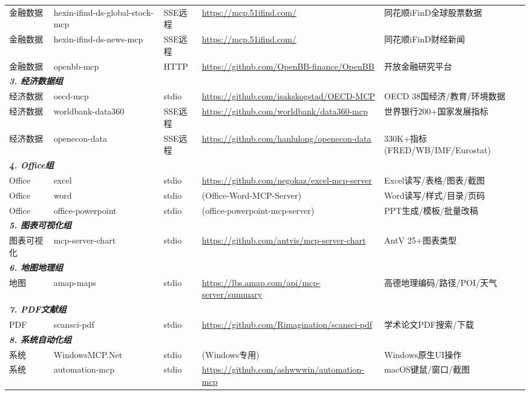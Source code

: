 \begin{table}[H]
\begin{tabular}{llllp{4cm}}
金融数据 & hexin-ifind-ds-global-stock-mcp & SSE远程 & \url{https://mcp.51ifind.com/} & 同花顺iFinD全球股票数据 \\
金融数据 & hexin-ifind-ds-news-mcp & SSE远程 & \url{https://mcp.51ifind.com/} & 同花顺iFinD财经新闻 \\
金融数据 & openbb-mcp & HTTP & \url{https://github.com/OpenBB-finance/OpenBB} & 开放金融研究平台 \\
\midrule
\multicolumn{5}{l}{\textit{\textbf{3. 经济数据组}}} \\
\midrule
经济数据 & oecd-mcp & stdio & \url{https://github.com/isakskogstad/OECD-MCP} & OECD 38国经济/教育/环境数据 \\
经济数据 & worldbank-data360 & SSE远程 & \url{https://github.com/worldbank/data360-mcp} & 世界银行200+国家发展指标 \\
经济数据 & openecon-data & SSE远程 & \url{https://github.com/hanlulong/openecon-data} & 330K+指标(FRED/WB/IMF/Eurostat) \\
\midrule
\multicolumn{5}{l}{\textit{\textbf{4. Office组}}} \\
\midrule
Office & excel & stdio & \url{https://github.com/negokaz/excel-mcp-server} & Excel读写/表格/图表/截图 \\
Office & word & stdio & (Office-Word-MCP-Server) & Word读写/样式/目录/页码 \\
Office & office-powerpoint & stdio & (office-powerpoint-mcp-server) & PPT生成/模板/批量改稿 \\
\midrule
\multicolumn{5}{l}{\textit{\textbf{5. 图表可视化组}}} \\
\midrule
图表可视化 & mcp-server-chart & stdio & \url{https://github.com/antvis/mcp-server-chart} & AntV 25+图表类型 \\
\midrule
\multicolumn{5}{l}{\textit{\textbf{6. 地图地理组}}} \\
\midrule
地图 & amap-maps & stdio & \url{https://lbs.amap.com/api/mcp-server/summary} & 高德地理编码/路径/POI/天气 \\
\midrule
\multicolumn{5}{l}{\textit{\textbf{7. PDF文献组}}} \\
\midrule
PDF & scansci-pdf & stdio & \url{https://github.com/Rimagination/scansci-pdf} & 学术论文PDF搜索/下载 \\
\midrule
\multicolumn{5}{l}{\textit{\textbf{8. 系统自动化组}}} \\
\midrule
系统 & WindowsMCP.Net & stdio & (Windows专用) & Windows原生UI操作 \\
系统 & automation-mcp & stdio & \url{https://github.com/ashwwwin/automation-mcp} & macOS键鼠/窗口/截图 \\

\end{tabular}
\end{table}
